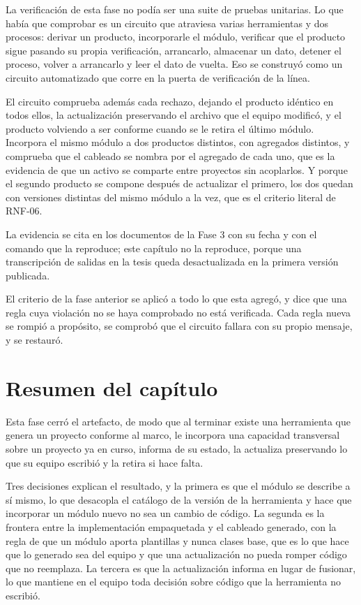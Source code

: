 La verificación de esta fase no podía ser una suite de pruebas unitarias. Lo
que había que comprobar es un circuito que atraviesa varias herramientas y
dos procesos: derivar un producto, incorporarle el módulo, verificar que el
producto sigue pasando su propia verificación, arrancarlo, almacenar un dato,
detener el proceso, volver a arrancarlo y leer el dato de vuelta. Eso se
construyó como un circuito automatizado que corre en la puerta de
verificación de la línea.

El circuito comprueba además cada rechazo, dejando el producto idéntico en
todos ellos, la actualización preservando el archivo que el equipo modificó,
y el producto volviendo a ser conforme cuando se le retira el último módulo.
Incorpora el mismo módulo a dos productos distintos, con agregados distintos,
y comprueba que el cableado se nombra por el agregado de cada uno, que es la
evidencia de que un activo se comparte entre proyectos sin acoplarlos. Y
porque el segundo producto se compone después de actualizar el primero, los
dos quedan con versiones distintas del mismo módulo a la vez, que es el
criterio literal de RNF-06.

La evidencia se cita en los documentos de la Fase 3 con su fecha y con el
comando que la reproduce; este capítulo no la reproduce, porque una
transcripción de salidas en la tesis queda desactualizada en la primera
versión publicada.

El criterio de la fase anterior se aplicó a todo lo que esta agregó, y dice
que una regla cuya violación no se haya comprobado no está verificada. Cada regla
nueva se rompió a propósito, se comprobó que el circuito fallara con su
propio mensaje, y se restauró.

\section{Resumen del capítulo}

Esta fase cerró el artefacto, de modo que al terminar existe una herramienta
que genera un proyecto conforme al marco, le incorpora una capacidad
transversal sobre un proyecto ya en curso, informa de su estado, la actualiza
preservando lo que su equipo escribió y la retira si hace falta.

Tres decisiones explican el resultado, y la primera es que el módulo se
describe a sí mismo, lo que desacopla el catálogo de la versión de la
herramienta y hace que incorporar un módulo nuevo no sea un cambio de código.
La segunda es la frontera entre la implementación empaquetada y el cableado
generado, con la regla de que un módulo aporta plantillas y nunca clases
base, que es lo que hace que lo generado sea del equipo y que una
actualización no pueda romper código que no reemplaza. La tercera es que la
actualización informa en lugar de fusionar, lo que mantiene en el equipo toda
decisión sobre código que la herramienta no escribió.

